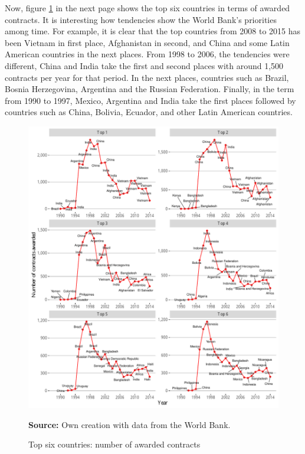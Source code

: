 Now, figure \ref{fig_major_num_awarded_top} in the next page shows the top six countries  in terms of awarded contracts. It is interesting how tendencies show the World Bank's priorities among time. For example, it is clear that the top countries from 2008 to 2015 has been Vietnam in first place, Afghanistan in second, and China and some Latin American countries in the next places. From 1998 to 2006, the tendencies were different, China and India take the first and second places with around 1,500 contracts per year for that period. In the next places, countries such as Brazil, Bosnia Herzegovina,  Argentina and the Russian Federation. Finally, in the term from 1990 to 1997, Mexico, Argentina and India take the first places followed by countries such as China, Bolivia, Ecuador, and other Latin American countries.

\begin{figure}[H]
\begin{center}
\caption{Top six countries: number of awarded contracts}
\label{fig_major_num_awarded_top}
\includegraphics[max width=.95\textwidth]{../img/major_historic_top_contracts_awarded.pdf}
\end{center}
\noindent \footnotesize{\textbf{Source:} Own creation with data from the World Bank.}
\end{figure}



